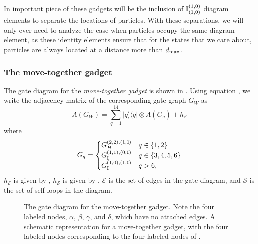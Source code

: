 \documentclass[../thesis-main/thesis-main]{subfiles}
\begin{document}
In important piece of these gadgets will be the inclusion of $\mathbb{I}_{(1,0)}^{(1,0)}$ diagram elements to separate the locations of particles.  With these separations, we will only ever need to analyze the case when particles occupy the same diagram element, as these identity elements ensure that for the states that we care about, particles are always located at a distance more than $d_{\text{max}}$.

\subsubsection{The move-together gadget}



The gate diagram for the \emph{move-together gadget} is shown in . Using equation , we write the adjacency matrix of the corresponding gate graph $G_W$ as 
\begin{equation}
A(G_W)=\sum_{q=1}^{14}|q\rangle\langle q|\otimes A(G_q)+h_{\mathcal{E}}\label{eq:move_together_adj}
\end{equation}
where
\begin{equation}
  G_q = \begin{cases}
    G_H^{(2,2),(1,1)} & q \in \{1,2\}\\
    G_{\mathbb{I}}^{(1,1),(0,0)} & q\in \{3,4,5,6\}\\
    G_{\mathbb{I}}^{(1,0),(1,0)} & q > 6,
  \end{cases}
\end{equation}
$h_{\mathcal{E}}$ is given by , $h_{\mathcal{S}}$ is given by ,  $\mathcal{E}$ is the set of edges in the gate diagram, and $\mathcal{S}$ is the set of self-loops in the diagram.

\begin{figure}
\centering 
{}
\hspace{1cm}
\caption{ The gate diagram for the move-together gadget.  Note the four labeled nodes, $\alpha$, $\beta$, $\gamma$, and $\delta$, which have no attached edges.   A schematic representation for a move-together gadget, with the four labeled nodes corresponding to the four labeled nodes of . \label{fig:W_gadget}} 
\end{figure}
\end{document}
